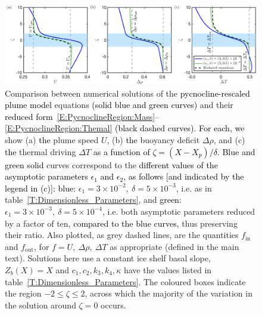\documentclass[openacc]{rsproca_new}%
\newcommand{\red}[1]{{\color{red} #1}}
\newcommand{\blue}[1]{{\color{blue} #1}}
\newcommand{\rout}[1]{\red{\st{#1}}}\newcommand{\ab}[1]{\textcolor{Green}{#1}}\newcommand{\about}[1]{\textcolor{Cyan}{\sout{#1}}}
\renewcommand{\rout}[1]{{}} %
\renewcommand{\blue}[1]{{\textcolor{black}{#1}}} %
\renewcommand{\red}[1]{{}} %
\newcommand{\epsone}{\epsilon_{1}} %
\newcommand{\epstwo}{\epsilon_{2}} %
\newcommand{\lt}{\delta} %
\renewcommand{\in}{\text{in}} %
\newcommand{\out}{\text{out}}
\begin{document}
\begin{figure}
\centering
\includegraphics[width = \textwidth]{./make_plots/plots/figure4.png}
\caption{Comparison between numerical solutions of the \blue{pycnocline-rescaled plume model} equations \rout{rescaled to the pycnocline}\blue{(solid blue and green curves)} and their \rout{leading order reduction }\blue{reduced form}~\eqref{E:PycnoclineRegion:Mass}--\eqref{E:PycnoclineRegion:Themal} \blue{(black dashed curves)}. \blue{For each,} \rout{W}\blue{w}e show (a) \blue{the} plume speed $U$, (b) \blue{the} buoyancy deficit $\Delta \rho$, and (c) \blue{the} thermal driving $\Delta T$ \blue{as a function of $\zeta = (X - X_p)/\delta$}. \blue{Blue and green solid}\rout{ Purple} curves correspond to the \blue{different values of the asymptotic parameters $\epsone$ and $\epstwo$, as follows [and indicated by the legend in (c)]:} \rout{full equations with} \blue{blue:} $\epsone = 3\times10^{-2}, ~\lt = 5\times10^{-3}$, i.e. as in table~\ref{T:Dimensionless_Parameters}, and \blue{green:} $\epsone = 3\times10^{-3},~ \lt = 5\times10^{-4}$, i.e. both asymptotic parameters reduced by a factor of ten\blue{, compared to the blue curves,} thus preserving their ratio. \rout{Black dashed curves correspond to the solution of the leading order equations.} Also plotted, as grey dashed lines, are the quantities $f_{\in}$ and $f_{\out}$, for $f = U,~ \Delta \rho, ~\Delta T$ as appropriate (defined in the main text). Solutions here use a constant ice shelf basal slope, $Z_b(X) = X$ and $c_1, c_2, k_3,k_4, \kappa$ have the values listed in table~\ref{T:Dimensionless_Parameters}. The coloured boxes indicate the region $-2 \leq \zeta  \leq 2$, across which the majority of the variation in the solution around $\zeta = 0 $ occurs.}\label{fig:PycnoclineAsymptotics}
\end{figure}
\end{document}
